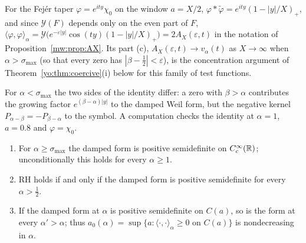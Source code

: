For the Fej\'er taper $\varphi=e^{ity}\chi_0$ on the window $a=X/2$, $\varphi*\widetilde\varphi=e^{ity}(1-|y|/X)_+$, and since $\mathcal Y(F)$ depends only on the even part of $F$, $\langle\varphi,\varphi\rangle_\alpha=\mathcal Y\bigl(e^{-\varepsilon|y|}\cos(ty)(1-|y|/X)_+\bigr)=2A_X(\varepsilon,t)$ in the notation of Proposition~\ref{mw:prop:AX}. Its part (c), $A_X(\varepsilon,t)\to v_\alpha(t)$ as $X\to\infty$ when $\alpha>\sigma_{\max}$ (so that every zero has $|\beta-\frac12|<\varepsilon$), is the concentration argument of Theorem~\ref{yo:thm:coercive}(i) below for this family of test functions.

\begin{remark}\label{yo:rem:mult}
For $\alpha<\sigma_{\max}$ the two sides of the identity differ: a zero with $\beta>\alpha$ contributes the growing factor $e^{(\beta-\alpha)|y|}$ to the damped Weil form, but the negative kernel $P_{\alpha-\beta}=-P_{\beta-\alpha}$ to the symbol. A computation checks the identity at $\alpha=1$, $a=0.8$ and $\varphi=\chi_0$.
\end{remark}

\begin{theorem}\label{yo:thm:damped}
\begin{enumerate}
\item[(i)] For $\alpha\ge\sigma_{\max}$ the damped form is positive semidefinite on $C_c^\infty(\mathbb{R})$; unconditionally this holds for every $\alpha\ge1$.
\item[(ii)] RH holds if and only if the damped form is positive semidefinite for every $\alpha>\frac12$.
\item[(iii)] If the damped form at $\alpha$ is positive semidefinite on $C(a)$, so is the form at every $\alpha'>\alpha$; thus $a_0(\alpha)=\sup\{a:\langle\cdot,\cdot\rangle_\alpha\ge0\text{ on }C(a)\}$ is nondecreasing in $\alpha$.
\end{enumerate}
\end{theorem}

